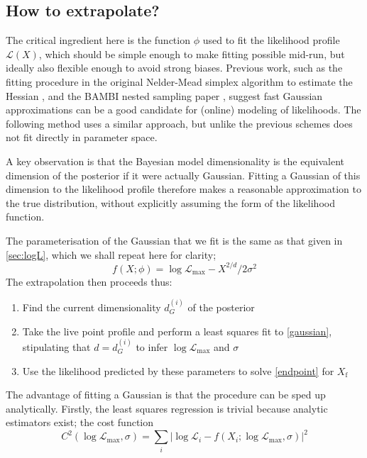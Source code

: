 \documentclass[usenatbib]{mnras}
\newcommand{\Like}{\mathcal{L}}
\newcommand{\logLmax}{\log \Like_\mathrm{max}}
\begin{document}
\subsection{How to extrapolate?}\label{sec:how_to_extrapolate}
The critical ingredient here is the function $\phi$ used to fit the likelihood profile $\Like(X)$, which should be simple enough to make fitting possible mid-run, but ideally also flexible enough to avoid strong biases. 
Previous work, such as the fitting procedure in the original Nelder-Mead simplex algorithm to estimate the Hessian \citep{nelder_mead}, and the BAMBI nested sampling paper \citep{Graff_2012}, suggest fast Gaussian approximations can be a good candidate for (online) modeling of likelihoods. The following method uses a similar approach, but unlike the previous schemes does not fit directly in parameter space.
\par
A key observation is that the Bayesian model dimensionality is the equivalent dimension of the posterior if it were actually Gaussian. Fitting a Gaussian of this dimension to the likelihood profile therefore makes a reasonable approximation to the true distribution, without explicitly assuming the form of the likelihood function. 
\par
The parameterisation of the Gaussian that we fit is the same as that given in \cref{sec:logL}, which we shall repeat here for clarity;
\begin{equation}\label{gaussian}
    f(X; \phi) = \logLmax - X^{2/d}/2\sigma^2
\end{equation}
The extrapolation then proceeds thus:
\begin{enumerate}[leftmargin=*]
    \item Find the current dimensionality ${d}^{(i)}_G$ of the posterior
    \item Take the live point profile and perform a least squares fit to \cref{gaussian}, stipulating that $d = {d}^{(i)}_G$ to infer $\logLmax$ and $\sigma$ 
    \item Use the likelihood predicted by these parameters to solve \cref{endpoint} for $X_\mathrm{f}$
\end{enumerate}
The advantage of fitting a Gaussian is that the procedure can be sped up analytically. Firstly, the least squares regression is trivial because analytic estimators exist; the cost function 
\begin{equation}\label{chi squared}
	C^2(\logLmax, \sigma) = \sum_i \left| \log \Like_i - f(X_i; \logLmax, \sigma) \right| ^2
\end{equation}
\end{document}
